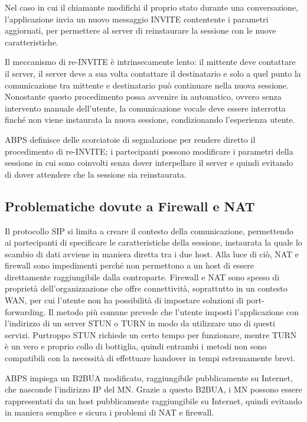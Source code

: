 \documentclass[12pt,a4paper,openright,twoside]{book}
\begin{document}
Nel caso in cui il chiamante modifichi il proprio stato durante una
conversazione, l'applicazione invia un nuovo messaggio INVITE
contentente i parametri aggiornati, per permettere al server di
reinstaurare la sessione con le nuove caratteristiche.

Il meccanismo di re-INVITE è intrinsecamente lento: il mittente deve
contattare il server, il server deve a sua volta contattare il
destinatario e solo a quel punto la comunicazione tra mittente e
destinatario può continuare nella nuova sessione. Nonostante questo
procedimento possa avvenire in automatico, ovvero senza intervento
manuale dell'utente, la comunicazione vocale deve essere interrotta
finché non viene instaurata la nuova sessione, condizionando
l'esperienza utente.

ABPS definisce delle scorciatoie di segnalazione per rendere diretto il
procedimento di re-INVITE; i partecipanti possono modificare i
parametri della sessione in cui sono coinvolti senza dover
interpellare il server e quindi evitando di dover attendere che la
sessione sia reinstaurata.

\subsection{Problematiche dovute a Firewall e NAT}

Il protocollo SIP si limita a creare il contesto della comunicazione,
permettendo ai partecipanti di specificare le caratteristiche della
sessione, instaurata la quale lo scambio di dati avviene in maniera
diretta tra i due host. Alla luce di ciò, NAT e firewall sono
impedimenti perché non permettono a un host di essere direttamente
raggiungibile dalla controparte. Firewall e NAT sono spesso di
proprietà dell'organizzazione che offre connettività, soprattutto in
un contesto WAN, per cui l'utente non ha possibilità di impostare
soluzioni di port-forwarding. Il metodo più comune prevede che
l'utente imposti l'applicazione con l'indirizzo di un server STUN o
TURN in modo da utilizzare uno di questi servizi. Purtroppo STUN
richiede un certo tempo per funzionare, mentre TURN è un vero e
proprio collo di bottiglia, quindi entrambi i metodi non sono
compatibili con la necessità di effettuare handover in tempi
estremamente brevi.

ABPS impiega un B2BUA modificato, raggiungibile pubblicamente su
Internet, che nasconde l'indirizzo IP del MN. Grazie a questo B2BUA, i
MN possono essere rappresentati da un host pubblicamente raggiungibile
su Internet, quindi evitando in maniera semplice e sicura i problemi
di NAT e firewall.
\end{document}
